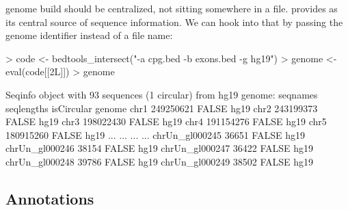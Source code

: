 \documentclass[10pt]{article}
\begin{document}
genome build should be centralized, not sitting somewhere in a
file. \Bioconductor{} provides  as its central
source of sequence information. We can hook into that by passing the
genome identifier instead of a file name:
\begin{Schunk}
\begin{Sinput}
> code <- bedtools_intersect("-a cpg.bed -b exons.bed -g hg19")
> genome <- eval(code[[2L]])
> genome
\end{Sinput}
\begin{Soutput}
Seqinfo object with 93 sequences (1 circular) from hg19 genome:
  seqnames       seqlengths isCircular genome
  chr1            249250621      FALSE   hg19
  chr2            243199373      FALSE   hg19
  chr3            198022430      FALSE   hg19
  chr4            191154276      FALSE   hg19
  chr5            180915260      FALSE   hg19
  ...                   ...        ...    ...
  chrUn_gl000245      36651      FALSE   hg19
  chrUn_gl000246      38154      FALSE   hg19
  chrUn_gl000247      36422      FALSE   hg19
  chrUn_gl000248      39786      FALSE   hg19
  chrUn_gl000249      38502      FALSE   hg19
\end{Soutput}
\end{Schunk}

\subsection{Annotations}
\end{document}
